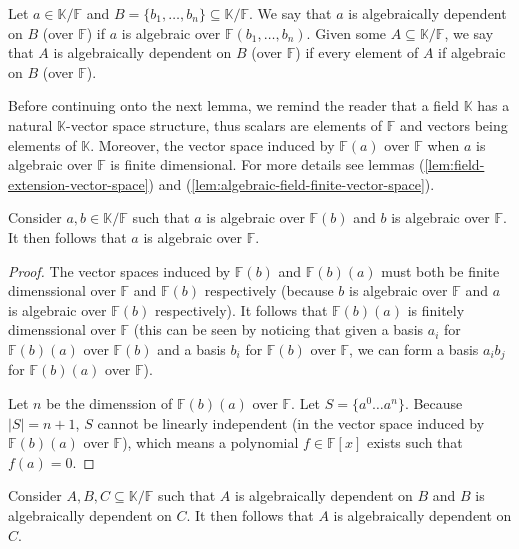 \begin{defn}
	Let $a \in \mathbb K / \mathbb F$ and $B = \{b _1, \ldots, b _n \} \subseteq  \mathbb K / \mathbb F$. We say that $a$ is algebraically dependent on $B$ (over $ \mathbb{F} $) if $a$ is algebraic over $\mathbb F(b _1, \ldots, b _n )$. Given some $A \subseteq  \mathbb K / \mathbb{F} $, we say that $A$ is algebraically dependent on $B$ (over $\mathbb{F} $) if every element of $A$ if algebraic on $B$ (over $\mathbb{F} $).
\end{defn}

Before continuing onto the next lemma, we remind the reader that a field $\mathbb{K}$ has a natural $\mathbb{K}$-vector space structure, thus scalars are elements of $\mathbb{F} $ and vectors being elements of $\mathbb K$. Moreover, the vector space induced by $\mathbb{F} (a)$ over $\mathbb{F} $ when $a$ is algebraic over $\mathbb{F} $ is finite dimensional. For more details see lemmas (\ref{lem:field-extension-vector-space}) and (\ref{lem:algebraic-field-finite-vector-space}).

\begin{lemma}\label{lem:algebraic-transitivity}
	Consider $a, b \in \mathbb K / \mathbb{F} $ such that $a$ is algebraic over $\mathbb{F}(b) $ and $b$ is algebraic over $\mathbb{F}$. It then follows that $a$ is algebraic over $\mathbb{F}$.
\end{lemma}

\begin{proof}
	The vector spaces induced by $\mathbb{F} (b)$ and $\mathbb{F} (b)(a)$ must both be finite dimenssional over $\mathbb{F} $ and $\mathbb{F} (b)$ respectively (because $b$ is algebraic over $\mathbb{F} $ and $a$ is algebraic over $\mathbb{F} (b)$ respectively). It follows that $\mathbb{F} (b)(a)$ is finitely dimenssional over $\mathbb{F}$ (this can be seen by noticing that given a basis $a _i $ for $\mathbb{F} (b)(a)$ over $\mathbb{F} (b)$ and a basis $b _i $ for $\mathbb{F} (b)$ over $\mathbb{F} $, we can form a basis $a _i b _j $ for $\mathbb{F} (b)(a)$ over $\mathbb{F} $).

	Let $n$ be the dimenssion of $\mathbb{F} (b)(a)$ over $\mathbb{F} $. Let $S = \{a ^0 \ldots a ^n \}$. Because $|S| = n + 1$, $S$ cannot be linearly independent (in the vector space induced by $\mathbb{F} (b)(a)$ over $\mathbb{F} $), which means a polynomial $f \in \mathbb{F} [x]$ exists such that $f(a) = 0$.
\end{proof}

\begin{lemma}\label{lem:algebraic-dependence-transitivity}
	Consider $A, B, C \subseteq \mathbb K / \mathbb{F} $ such that $A$ is algebraically dependent on $B$ and $B$ is algebraically dependent on $C$. It then follows that $A$ is algebraically dependent on $C$.
\end{lemma}

